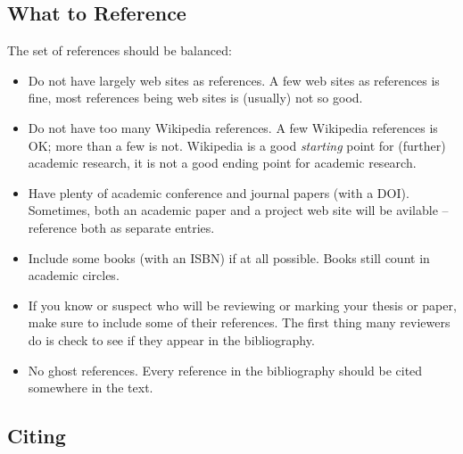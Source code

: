 \subsection{What to Reference}

The set of references should be balanced:
\begin{itemize}
\item Do not have largely web sites as references. A few web sites as
  references is fine, most references being web sites is (usually) not
  so good.

\item Do not have too many Wikipedia references. A few Wikipedia
  references is OK; more than a few is not. Wikipedia is a good
  \emph{starting} point for (further) academic research, it is not a
  good ending point for academic research.

\item Have plenty of academic conference and journal papers (with a
  DOI). Sometimes, both an academic paper and a project web site will
  be avilable -- reference both as separate entries.

\item Include some books (with an ISBN) if at all possible. Books
  still count in academic circles.
 
\item If you know or suspect who will be reviewing or marking your
  thesis or paper, make sure to include some of their references. The
  first thing many reviewers do is check to see if they appear in the
  bibliography.

\item No ghost references. Every reference in the bibliography should
  be cited somewhere in the text.

\end{itemize}






\subsection{Citing}

